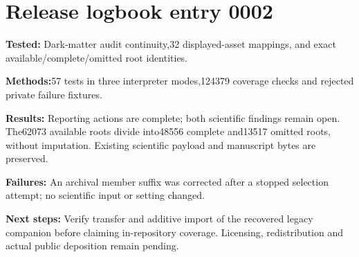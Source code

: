 \section*{Release logbook entry 0002}
\textbf{Tested:} Dark-matter audit continuity,32 displayed-asset mappings, and exact available/complete/omitted root identities.

\textbf{Methods:}57 tests in three interpreter modes,124379 coverage checks and rejected private failure fixtures.

\textbf{Results:} Reporting actions are complete; both scientific findings remain open. The62073 available roots divide into48556 complete and13517 omitted roots, without imputation. Existing scientific payload and manuscript bytes are preserved.

\textbf{Failures:} An archival member suffix was corrected after a stopped selection attempt; no scientific input or setting changed.

\textbf{Next steps:} Verify transfer and additive import of the recovered legacy companion before claiming in-repository coverage. Licensing, redistribution and actual public deposition remain pending.
